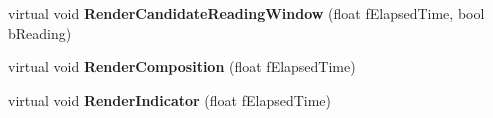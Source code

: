 \begin{DoxyCompactItemize}
\item 
\hypertarget{class_c_d_x_u_t_i_m_e_edit_box_a14c85eb40f74f6b80d7b2196713f8fce}{virtual void {\bfseries Render\+Candidate\+Reading\+Window} (float f\+Elapsed\+Time, bool b\+Reading)}\label{class_c_d_x_u_t_i_m_e_edit_box_a14c85eb40f74f6b80d7b2196713f8fce}

\item 
\hypertarget{class_c_d_x_u_t_i_m_e_edit_box_ae26756c803aacdeacc543fc524cf2060}{virtual void {\bfseries Render\+Composition} (float f\+Elapsed\+Time)}\label{class_c_d_x_u_t_i_m_e_edit_box_ae26756c803aacdeacc543fc524cf2060}

\item 
\hypertarget{class_c_d_x_u_t_i_m_e_edit_box_afb0488252c720a51c9fa5602b63d421e}{virtual void {\bfseries Render\+Indicator} (float f\+Elapsed\+Time)}\label{class_c_d_x_u_t_i_m_e_edit_box_afb0488252c720a51c9fa5602b63d421e}

\end{DoxyCompactItemize}

